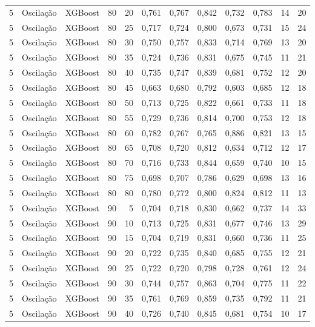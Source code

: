 \begin{longtable}{@{}rllrrrrrrrrr@{}}
5 & Oscilação & XGBoost & 80 & 20 & 0,761 & 0,767 & 0,842 & 0,732 & 0,783 & 14 & 20 \\
5 & Oscilação & XGBoost & 80 & 25 & 0,717 & 0,724 & 0,800 & 0,673 & 0,731 & 15 & 24 \\
5 & Oscilação & XGBoost & 80 & 30 & 0,750 & 0,757 & 0,833 & 0,714 & 0,769 & 13 & 20 \\
5 & Oscilação & XGBoost & 80 & 35 & 0,724 & 0,736 & 0,831 & 0,675 & 0,745 & 11 & 21 \\
5 & Oscilação & XGBoost & 80 & 40 & 0,735 & 0,747 & 0,839 & 0,681 & 0,752 & 12 & 20 \\
5 & Oscilação & XGBoost & 80 & 45 & 0,663 & 0,680 & 0,792 & 0,603 & 0,685 & 12 & 18 \\
5 & Oscilação & XGBoost & 80 & 50 & 0,713 & 0,725 & 0,822 & 0,661 & 0,733 & 11 & 18 \\
5 & Oscilação & XGBoost & 80 & 55 & 0,729 & 0,736 & 0,814 & 0,700 & 0,753 & 12 & 18 \\
5 & Oscilação & XGBoost & 80 & 60 & 0,782 & 0,767 & 0,765 & 0,886 & 0,821 & 13 & 15 \\
5 & Oscilação & XGBoost & 80 & 65 & 0,708 & 0,720 & 0,812 & 0,634 & 0,712 & 12 & 17 \\
5 & Oscilação & XGBoost & 80 & 70 & 0,716 & 0,733 & 0,844 & 0,659 & 0,740 & 10 & 15 \\
5 & Oscilação & XGBoost & 80 & 75 & 0,698 & 0,707 & 0,786 & 0,629 & 0,698 & 13 & 16 \\
5 & Oscilação & XGBoost & 80 & 80 & 0,780 & 0,772 & 0,800 & 0,824 & 0,812 & 11 & 13 \\
5 & Oscilação & XGBoost & 90 & 5 & 0,704 & 0,718 & 0,830 & 0,662 & 0,737 & 14 & 33 \\
5 & Oscilação & XGBoost & 90 & 10 & 0,713 & 0,725 & 0,831 & 0,677 & 0,746 & 13 & 29 \\
5 & Oscilação & XGBoost & 90 & 15 & 0,704 & 0,719 & 0,831 & 0,660 & 0,736 & 11 & 25 \\
5 & Oscilação & XGBoost & 90 & 20 & 0,722 & 0,735 & 0,840 & 0,685 & 0,755 & 12 & 21 \\
5 & Oscilação & XGBoost & 90 & 25 & 0,722 & 0,720 & 0,798 & 0,728 & 0,761 & 12 & 24 \\
5 & Oscilação & XGBoost & 90 & 30 & 0,744 & 0,757 & 0,863 & 0,704 & 0,775 & 11 & 22 \\
5 & Oscilação & XGBoost & 90 & 35 & 0,761 & 0,769 & 0,859 & 0,735 & 0,792 & 11 & 21 \\
5 & Oscilação & XGBoost & 90 & 40 & 0,726 & 0,740 & 0,845 & 0,681 & 0,754 & 10 & 17 \\

\end{longtable}
